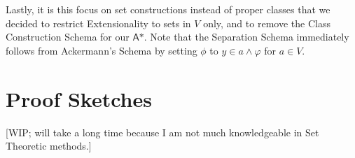 \documentclass{article}
\begin{document}
Lastly, it is this focus on set constructions instead of proper classes that we decided to restrict Extensionality to sets in $V$ only, and to remove the Class Construction Schema for our $\textsf{A*}$. Note that the Separation Schema immediately follows from Ackermann's Schema by setting $\phi$ to $y \in a \wedge \varphi$ for $a\in V$.




\appendix

\section{Proof Sketches}\label{proof-sketch}
[WIP; will take a long time because I am not much knowledgeable in Set Theoretic methods.]
\end{document}
